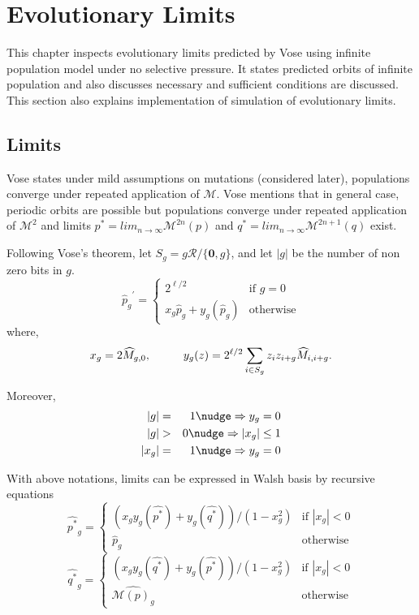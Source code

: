 \chapter{Evolutionary Limits} \label{ch:evolutionary limits}
This chapter inspects evolutionary limits predicted by Vose using infinite population model under no selective pressure. It states predicted orbits of infinite population and also discusses necessary and sufficient conditions are discussed. This section also explains implementation of simulation of evolutionary limits.

\section{Limits}
Vose states under mild assumptions on mutations (considered later), populations converge under repeated application of $\mathcal{M}$. Vose mentions that in general case, periodic orbits are possible but populations converge under repeated application of $\mathcal{M}^2$ and limits $p^\ast = lim_{n \rightarrow \infty} \mathcal{M}^{2n}(p)$ and $q^\ast = lim_{n \rightarrow \infty} \mathcal{M}^{2n+1}(q)$ exist.

Following Vose's theorem, let $S_g = g \mathcal{R} / \{\textbf{0}, g\}$, and let $|g|$ be the number of non zero bits in $g$.
\[
{{\widehat{p}}_g}^{\prime}  = \begin{cases}
    2^{\ell /2}  & \text{if $g = 0$}\\
    x_g \widehat{p}_g + y_g(\widehat{p}_g) & \text{otherwise}
  \end{cases}
\]
where,
\[
x_g = 2\widehat{M}_{g,0},  \hspace*{1cm} y_g(z) = 2^{\ell /2} \sum_{i \in S_g} z_i z_{i+g} \widehat{M}_{i,i+g}.
\]

Moreover, 
\begin{eqnarray*}
|g| & = & 1 \nudge \Rightarrow y_g = 0 \\
|g| & > & 0 \nudge \Rightarrow |x_g| \leq 1 \\
|x_g| & = & 1 \nudge \Rightarrow y_g = 0
\end{eqnarray*}

With above notations, limits can be expressed in Walsh basis by recursive equations 
\begin{equation}
\label{lt1}
\widehat{p^{\ast}}_g  = \begin{cases}
    (x_g y_g(\widehat{p^{\ast}}) + y_g(\widehat{q^{\ast}}))/(1-x_g^2)  & \text{if $|x_g| < 0$}\\
    \widehat{p}_g  & \text{otherwise}
  \end{cases}
\end{equation}
\begin{equation}
\label{lt2}
\widehat{q^{\ast}}_g  = \begin{cases}
    (x_g y_g(\widehat{q^{\ast}}) + y_g(\widehat{p^{\ast}}))/(1-x_g^2)  & \text{if $|x_g| < 0$}\\
    \widehat{\mathcal{M}(p)_g}  & \text{otherwise}
  \end{cases}
\end{equation}

